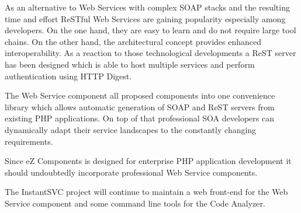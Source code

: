 \documentclass[10pt,final,a4paper,oneside]{article}
\begin{document}
As an alternative to Web Services with complex SOAP stacks and the 
resulting time and effort ReSTful Web Services are gaining popularity 
especially among developers. On the one hand, they are easy to learn and 
do not require large tool chains. On the other hand, the architectural 
concept provides enhanced interoperability. As a reaction to those 
technological developments a ReST server has been designed which is able 
to host multiple services and perform authentication using HTTP 
Digest.

The Web Service component all proposed components into one convenience 
library which allows automatic generation of SOAP and ReST servers from 
existing PHP applications. On top of that professional SOA developers 
can dynamically adapt their service landscapes to the constantly 
changing requirements. 

Since eZ Components is designed for enterprise PHP application development
it should undoubtedly incorporate professional Web Service components.

The InstantSVC project will continue to maintain a web front-end for the 
Web Service component and some command line tools for the Code Analyzer. 
\end{document}
